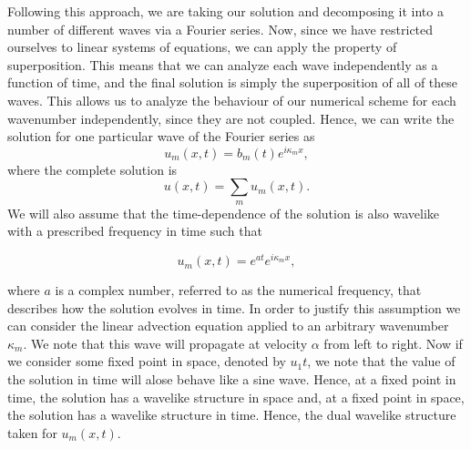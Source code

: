 Following this approach, we are taking our solution and decomposing it into a number of different waves via a Fourier series. Now, since we have restricted ourselves to linear systems of equations, we can apply the property of superposition. This means that we can analyze each wave independently as a function of time, and the final solution is simply the superposition of all of these waves. This allows us to analyze the behaviour of our numerical scheme for each wavenumber independently, since they are not coupled. Hence, we can write the solution for one particular wave of the Fourier series as
\begin{equation}
	u_m(x,t) = b_m(t) e^{i \kappa_m x},
\end{equation}
where the complete solution is
\begin{equation}
	u(x,t) = \sum_{m} u_m(x,t).
\end{equation}
We will also assume that the time-dependence of the solution is also wavelike with a prescribed frequency in time such that
\begin{eqBox}
\begin{equation}
	u_m(x,t) = e^{at} e^{i \kappa_m x},
\end{equation}
\end{eqBox}
where $a$ is a complex number, referred to as the numerical frequency, that describes how the solution evolves in time. In order to justify this assumption we can consider the linear advection equation applied to an arbitrary wavenumber $\kappa_m$. We note that this wave will propagate at velocity $\alpha$ from left to right. Now if we consider some fixed point in space, denoted by $u_1{t}$, we note that the value of the solution in time will alose behave like a sine wave. Hence, at a fixed point in time, the solution has a wavelike structure in space and, at a fixed point in space, the solution has a wavelike structure in time. Hence, the dual wavelike structure taken for $u_m(x,t)$.

